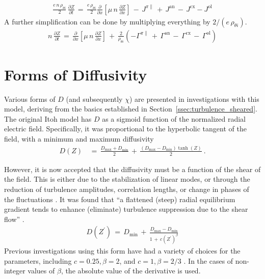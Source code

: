 \begin{align} %
	\frac{e \, n \, \rho_{\theta i}}{2} \, \frac{\partial Z}{\partial t}
		\,=\, \frac{e \, \rho_{\theta i}}{2} \frac{\partial}{\partial x}
		\left[\mu \, n \, \frac{\partial Z}{\partial x}\right] \,-\,
		J^{\pi\parallel} \,+\, J^\text{an} \,-\, J^\text{cx} - J^\text{ol}
		\label{eq:normalized_Z_equation}
\end{align}
A further simplification can be done by multiplying everything by $2 / (e \, \rho_{\theta i})$.
\begin{align} %
	n \, \frac{\partial Z}{\partial t} \,=\, \frac{\partial}{\partial x}
		\left[\mu \, n \, \frac{\partial Z}{\partial x}\right] \,+\,
		\frac{2}{\rho_{\theta i}} \left(-\Gamma^{\pi\parallel} \,+\,
		\Gamma^\text{an} \,-\, \Gamma^\text{cx} \,-\, \Gamma^\text{ol}\right)
		\label{eq:reduced_normalized_Z_equation}
\end{align}

\section{Forms of Diffusivity}\label{sec:diffusivity}
Various forms of $D$ (and subsequently $\chi$) are presented in investigations with this model, deriving from the basics established in Section~\ref{ssec:turbulence_sheared}.
The original Itoh model has $D$ as a sigmoid function of the normalized radial electric field.
Specifically, it was proportional to the hyperbolic tangent of the field, with a minimum and maximum diffusivity \cite{itoh_edge_1991, zohm_dynamic_1994}
\begin{align} %
	D(Z) \,&=\, \frac{D_\text{max} + D_\text{min}}{2} \,+\,
		\frac{(D_\text{max} - D_\text{min})\tanh(Z)}{2}~.
		\label{eq:Itoh_diffusivity}
\end{align}

However, it is now accepted that the diffusivity must be a function of the shear of the field.
This is either due to the stabilization of linear modes, or through the reduction of turbulence amplitudes, correlation lengths, or change in phases of the fluctuations \cite{connor_review_2000}.
It was found that ``a flattened (steep) radial equilibrium gradient tends to enhance (eliminate) turbulence suppression due to the shear flow'' \cite{zhang_edge_1992}.
\begin{align} %
	D(Z^{\prime}) \,=\, D_\text{min} \,+\, \frac{D_\text{max} - D_\text{min}}
		{1 \,+\, c(Z^{\prime})^{\beta}} \label{eq:shear_diffusivity}
\end{align}
Previous investigations using this form have had a variety of choices for the parameters, including $c = 0.25, \beta = 2$, and $c = 1, \beta = 2/3$ \cite{connor_review_2000} \cite{itoh_theoretical_1994}.
In the cases of non-integer values of $\beta$, the absolute value of the derivative is used.

